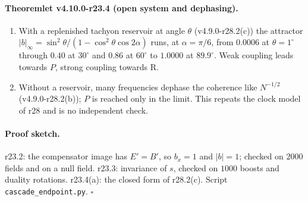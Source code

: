 \paragraph{Theoremlet v4.10.0-r23.4 (open system and dephasing).}
\begin{enumerate}[leftmargin=2em]
\item[(a)] With a replenished tachyon reservoir at angle \(\theta\) (v4.9.0-r28.2(c)) the attractor
\(|b|_\infty=\sin^2\theta/(1-\cos^2\theta\cos2\alpha)\) runs, at \(\alpha=\pi/6\), from \(0.0006\) at \(\theta=1^\circ\) through \(0.40\) at \(30^\circ\) and \(0.86\)
at \(60^\circ\) to \(1.0000\) at \(89.9^\circ\).  Weak coupling leads towards \(P\), strong coupling towards R.
\item[(b)] Without a reservoir, many frequencies dephase the coherence like \(N^{-1/2}\) (v4.9.0-r28.2(b)); \(P\) is reached only in the limit.
This repeats the clock model of r28 and is no independent check.
\end{enumerate}

\paragraph{Proof sketch.}
r23.2: the compensator image has \(E'=B'\), so \(b_x=1\) and \(|b|=1\); checked on \(2000\) fields and on a null field.  r23.3: invariance
of \(s\), checked on \(1000\) boosts and duality rotations.  r23.4(a): the closed form of r28.2(c).  Script
\texttt{cascade\_\allowbreak endpoint.py}.  \(\square\)

